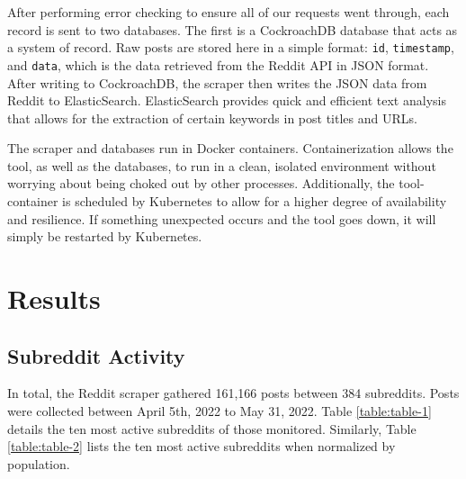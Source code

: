 \documentclass[12pt,oneside, letterpaper]{book}
\begin{document}
\par After performing error checking to ensure all of our requests went through, each record is sent to two databases. The first is a CockroachDB database that acts as a system of record. Raw posts are stored here in a simple format: \texttt{id}, \texttt{timestamp}, and \texttt{data}, which is the data retrieved from the Reddit API in JSON format. After writing to CockroachDB, the scraper then writes the JSON data from Reddit to ElasticSearch. ElasticSearch provides quick and efficient text analysis that allows for the extraction of certain keywords in post titles and URLs.

\par The scraper and databases run in Docker containers. Containerization allows the tool, as well as the databases, to run in a clean, isolated environment without worrying about being choked out by other processes. Additionally, the tool-container is scheduled by Kubernetes to allow for a higher degree of availability and resilience. If something unexpected occurs and the tool goes down, it will simply be restarted by Kubernetes.

\section{Results}

\subsection{Subreddit Activity}

\par In total, the Reddit scraper gathered 161,166 posts between 384 subreddits. Posts were collected between April 5th, 2022 to May 31, 2022. Table \ref{table:table-1} details the ten most active subreddits of those monitored. Similarly, Table \ref{table:table-2} lists the ten most active subreddits when normalized by population.
\end{document}
